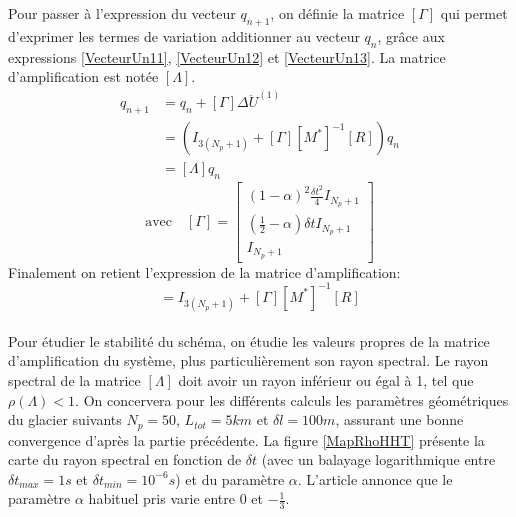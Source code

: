 \documentclass[11pt, a4paper]{article}
\begin{document}
Pour passer à l'expression du vecteur $q_{n+1}$, on définie la matrice $[\Gamma ] $ qui permet d'exprimer les termes de variation additionner au vecteur $q_n$, grâce aux expressions \ref{VecteurUn11}, \ref{VecteurUn12} et \ref{VecteurUn13}. La matrice d'amplification est notée $[\Lambda]$.
\begin{align*}
q_{n+1} &= q_n + [\Gamma] \Delta \ddot{U}^{(1)} \\
\quad &= \left( I_{3 (N_p+1)} + [\Gamma] [M^*]^{-1} [R] \right) q_n \\
\quad &= [ \Lambda ] q_n
\end{align*}
$$ \text{avec} \quad [\Gamma] = \begin{bmatrix}  (1-\alpha)^2 \frac{\delta t^2}{4} I_{N_p+1} \\ (\frac{1}{2} - \alpha) \delta t I_{N_p+1} \\ I_{N_p+1} \end{bmatrix} $$
Finalement on retient l'expression de la matrice d'amplification:
\begin{equation}
[\Lambda] = I_{3 (N_p+1)} + [\Gamma] [M^*]^{-1} [R] \label{LambdaMatrix}
\end{equation}
\\

Pour étudier le stabilité du schéma, on étudie les valeurs propres de la matrice d'amplification du système, plus particulièrement son rayon spectral. Le rayon spectral de la matrice $[\Lambda ]$ doit avoir un rayon inférieur ou égal à 1, tel que $\rho(\Lambda) <1$. On concervera pour les différents calculs les paramètres géométriques du glacier suivants $N_p = 50$, $L_{tot} = 5km$ et $\delta l = 100m$, assurant une bonne convergence d'après la partie précédente.
\setlength{\parindent}{1cm} La figure \ref{MapRhoHHT} présente la carte du rayon spectral en fonction de $\delta t $ (avec un balayage logarithmique entre $\delta t_{max}=1s$ et $\delta t_{min}=10^{-6}s$) et du paramètre $\alpha$. L'article \cite{Hughe1989} annonce que le paramètre $\alpha$ habituel pris varie entre 0 et $-\frac{1}{3} $. 
\\
\end{document}

